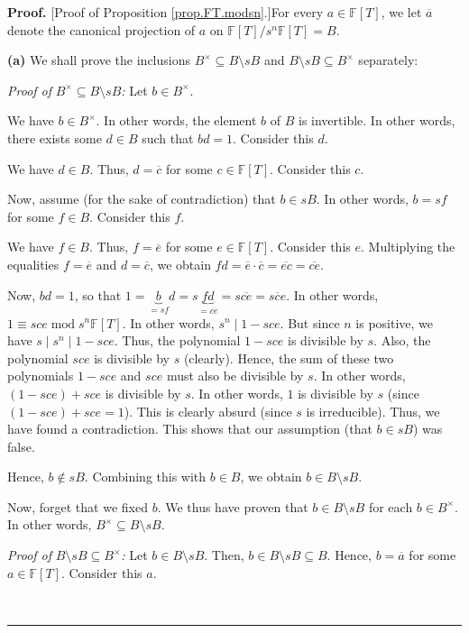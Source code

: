 \documentclass[numbers=enddot,12pt,final,onecolumn,notitlepage]{scrartcl}%
\theoremstyle{definition}
\newenvironment{proof}[1][Proof]{\noindent\textbf{#1.} }{\ \rule{0.5em}{0.5em}}
\begin{document}
\begin{proof}
[Proof of Proposition \ref{prop.FT.modsn}.]For every $a\in\mathbb{F}\left[
T\right]  $, we let $\overline{a}$ denote the canonical projection of $a$ on
$\mathbb{F}\left[  T\right]  /s^{n}\mathbb{F}\left[  T\right]  =B$. \medskip

\textbf{(a)} We shall prove the inclusions $B^{\times}\subseteq B\setminus sB$
and $B\setminus sB\subseteq B^{\times}$ separately:

\textit{Proof of }$B^{\times}\subseteq B\setminus sB$\textit{:} Let $b\in
B^{\times}$.

We have $b\in B^{\times}$. In other words, the element $b$ of $B$ is
invertible. In other words, there exists some $d\in B$ such that $bd=1$.
Consider this $d$.

We have $d\in B$. Thus, $d=\overline{c}$ for some $c\in\mathbb{F}\left[
T\right]  $. Consider this $c$.

Now, assume (for the sake of contradiction) that $b\in sB$. In other words,
$b=sf$ for some $f\in B$. Consider this $f$.

We have $f\in B$. Thus, $f=\overline{e}$ for some $e\in\mathbb{F}\left[
T\right]  $. Consider this $e$. Multiplying the equalities $f=\overline{e}$
and $d=\overline{c}$, we obtain $fd=\overline{e}\cdot\overline{c}%
=\overline{ec}=\overline{ce}$.

Now, $bd=1$, so that $1=\underbrace{b}_{=sf}d=s\underbrace{fd}_{=\overline
{ce}}=s\overline{ce}=\overline{sce}$. In other words, $1\equiv
sce\operatorname{mod}s^{n}\mathbb{F}\left[  T\right]  $. In other words,
$s^{n}\mid1-sce$. But since $n$ is positive, we have $s\mid s^{n}\mid1-sce$.
Thus, the polynomial $1-sce$ is divisible by $s$. Also, the polynomial $sce$
is divisible by $s$ (clearly). Hence, the sum of these two polynomials $1-sce$
and $sce$ must also be divisible by $s$. In other words, $\left(
1-sce\right)  +sce$ is divisible by $s$. In other words, $1$ is divisible by
$s$ (since $\left(  1-sce\right)  +sce=1$). This is clearly absurd (since $s$
is irreducible). Thus, we have found a contradiction. This shows that our
assumption (that $b\in sB$) was false.

Hence, $b\notin sB$. Combining this with $b\in B$, we obtain $b\in B\setminus
sB$.

Now, forget that we fixed $b$. We thus have proven that $b\in B\setminus sB$
for each $b\in B^{\times}$. In other words, $B^{\times}\subseteq B\setminus
sB$.

\textit{Proof of }$B\setminus sB\subseteq B^{\times}$\textit{:} Let $b\in
B\setminus sB$. Then, $b\in B\setminus sB\subseteq B$. Hence, $b=\overline{a}$
for some $a\in\mathbb{F}\left[  T\right]  $. Consider this $a$.


\end{proof}
\end{document}

